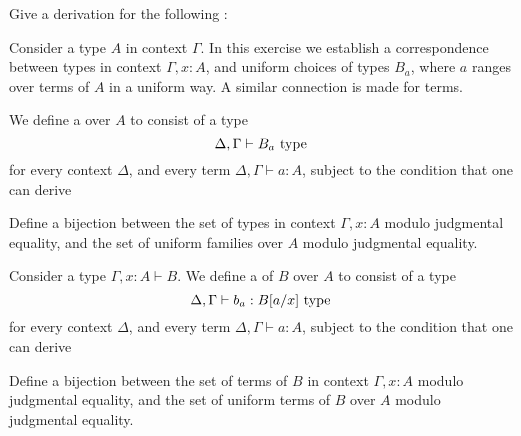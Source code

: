 \begin{exercises}
\exercise \label{ex:term_conversion}Give a derivation for the following :
\begin{prooftree}
\end{prooftree}
\exercise Consider a type $A$ in context $\Gamma$. In this exercise we establish a correspondence between types in context $\Gamma,x:A$, and uniform choices of types $B_a$, where $a$ ranges over terms of $A$ in a uniform way. A similar connection is made for terms.
  \begin{subexenum}
  \item We define a  over $A$ to consist of a type
    \begin{equation*}
      \Delta,\Gamma\vdash B_a~\type
    \end{equation*}
    for every context $\Delta$, and every term $\Delta,\Gamma\vdash a:A$, subject to the condition that one can derive
    \begin{prooftree}
    \end{prooftree}
    Define a bijection between the set of types in context $\Gamma,x:A$ modulo judgmental equality, and the set of uniform families over $A$ modulo judgmental equality. 
  \item Consider a type $\Gamma,x:A\vdash B$. We define a  of $B$ over $A$ to consist of a type
    \begin{equation*}
      \Delta,\Gamma\vdash b_a:B[a/x]~\type
    \end{equation*}
    for every context $\Delta$, and every term $\Delta,\Gamma\vdash a:A$, subject to the condition that one can derive
    \begin{prooftree}
    \end{prooftree}
    Define a bijection between the set of terms of $B$ in context $\Gamma,x:A$ modulo judgmental equality, and the set of uniform terms of $B$ over $A$ modulo judgmental equality. 
  \end{subexenum}
\end{exercises}
